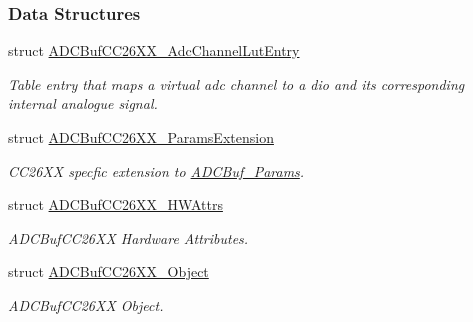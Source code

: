 \subsubsection*{Data Structures}
\begin{DoxyCompactItemize}
\item 
struct \hyperlink{struct_a_d_c_buf_c_c26_x_x___adc_channel_lut_entry}{A\+D\+C\+Buf\+C\+C26\+X\+X\+\_\+\+Adc\+Channel\+Lut\+Entry}
\begin{DoxyCompactList}\small\item\em Table entry that maps a virtual adc channel to a dio and its corresponding internal analogue signal. \end{DoxyCompactList}\item 
struct \hyperlink{struct_a_d_c_buf_c_c26_x_x___params_extension}{A\+D\+C\+Buf\+C\+C26\+X\+X\+\_\+\+Params\+Extension}
\begin{DoxyCompactList}\small\item\em C\+C26\+X\+X specfic extension to \hyperlink{struct_a_d_c_buf___params}{A\+D\+C\+Buf\+\_\+\+Params}. \end{DoxyCompactList}\item 
struct \hyperlink{struct_a_d_c_buf_c_c26_x_x___h_w_attrs}{A\+D\+C\+Buf\+C\+C26\+X\+X\+\_\+\+H\+W\+Attrs}
\begin{DoxyCompactList}\small\item\em A\+D\+C\+Buf\+C\+C26\+X\+X Hardware Attributes. \end{DoxyCompactList}\item 
struct \hyperlink{struct_a_d_c_buf_c_c26_x_x___object}{A\+D\+C\+Buf\+C\+C26\+X\+X\+\_\+\+Object}
\begin{DoxyCompactList}\small\item\em A\+D\+C\+Buf\+C\+C26\+X\+X Object. \end{DoxyCompactList}\end{DoxyCompactItemize}
